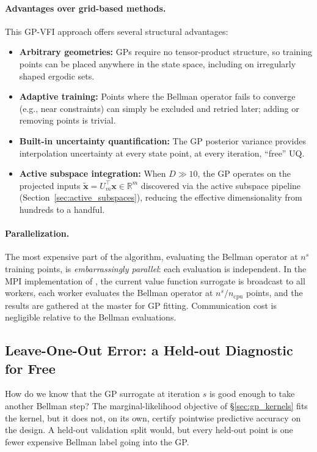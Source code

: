 \documentclass[11pt,a4paper]{report}
\newcommand{\x}{\bm{x}}
\newcommand{\R}{\mathbb{R}}
\begin{document}
\paragraph{Advantages over grid-based methods.}  This GP-VFI approach offers several structural advantages:
\begin{itemize}[itemsep=2pt]
\item \textbf{Arbitrary geometries:} GPs require no tensor-product structure, so training points can be placed anywhere in the state space, including on irregularly shaped ergodic sets.
\item \textbf{Adaptive training:} Points where the Bellman operator fails to converge (e.g., near constraints) can simply be excluded and retried later; adding or removing points is trivial.
\item \textbf{Built-in uncertainty quantification:} The GP posterior variance provides interpolation uncertainty at every state point, at every iteration, ``free'' UQ.
\item \textbf{Active subspace integration:} When $D \gg 10$, the GP operates on the projected inputs $\tilde{\x} = U_m^\top \x \in \R^m$ discovered via the active subspace pipeline (Section~\ref{sec:active_subspaces}), reducing the effective dimensionality from hundreds to a handful.
\end{itemize}

\paragraph{Parallelization.}
The most expensive part of the algorithm, evaluating the Bellman operator at $n^s$ training points, is \emph{embarrassingly parallel}: each evaluation is independent.  In the MPI implementation of \citet{SCHEIDEGGER201968}, the current value function surrogate is broadcast to all workers, each worker evaluates the Bellman operator at $n^s/n_\mathrm{cpu}$ points, and the results are gathered at the master for GP fitting.  Communication cost is negligible relative to the Bellman evaluations.

\subsection{Leave-One-Out Error: a Held-out Diagnostic for Free}
\label{sec:gp_loo}

How do we know that the GP surrogate at iteration $s$ is good enough to take another Bellman step?  The marginal-likelihood objective of \S\ref{sec:gp_kernels} fits the kernel, but it does not, on its own, certify pointwise predictive accuracy on the design.  A held-out validation split would, but every held-out point is one fewer expensive Bellman label going into the GP.
\end{document}
